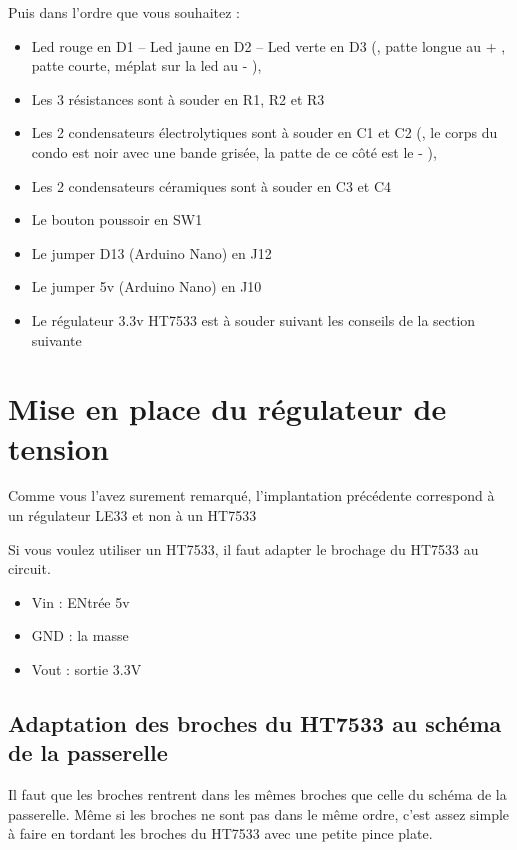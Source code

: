 Puis dans l'ordre que vous souhaitez : 
\begin{itemize}
    \item Led rouge en D1 – Led jaune en D2 – Led verte en D3 ({\color{red}{sont polarisées}}, patte longue au + ,  patte courte, méplat sur la led au - ),
    \item Les 3 résistances sont à souder en R1, R2 et R3
    \item Les 2 condensateurs électrolytiques sont à souder en C1 et C2 ({\color{red}{sont polarisées}}, le corps du condo est noir avec une bande grisée, la patte de ce côté est le - ),
    \item Les 2 condensateurs céramiques sont à souder en C3 et C4
    \item Le bouton poussoir en SW1
    \item Le jumper D13 (Arduino Nano) en J12
    \item Le jumper 5v (Arduino Nano) en J10
    \item Le régulateur 3.3v HT7533 est à souder suivant les conseils de la section suivante
\end{itemize}

\section{Mise en place du régulateur de tension}

Comme vous l'avez surement remarqué, l'implantation précédente correspond à un régulateur LE33 et non à un HT7533

Si vous voulez utiliser un HT7533, il faut adapter le brochage du HT7533 au circuit.

\begin{itemize}
    \item Vin : ENtrée 5v
    \item GND : la masse
    \item Vout : sortie 3.3V
\end{itemize}


\subsection{Adaptation des broches du HT7533 au schéma de la passerelle}

Il faut que les broches  rentrent dans les mêmes broches que celle du schéma de la passerelle. Même si les broches ne sont pas dans le même ordre, c'est assez simple à faire en tordant les broches du HT7533 avec une petite pince plate.\\

